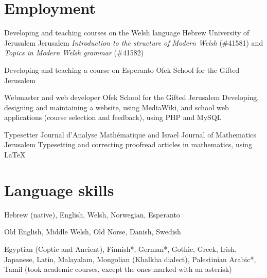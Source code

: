


\section{Employment}

	{Developing and teaching courses on the Welsh language}
	{Hebrew University of Jerusalem}
	{Jerusalem}
	{}
	{\emph{Introduction to the structure of Modern Welsh} (\#41581) and \emph{Topics in Modern Welsh grammar} (\#41582)}

	{Developing and teaching a course on Esperanto}
	{Ofek School for the Gifted}
	{Jerusalem}
	{}
	{}

	{Webmaster and web developer}
	{Ofek School for the Gifted}
	{Jerusalem}
	{}
	{Developing, designing and maintaining a website, using MediaWiki, and school web applications (course selection and feedback), using PHP and MySQL}

	{Typesetter}
	{Journal d’Analyse Mathématique and Israel Journal of Mathematics}
	{Jerusalem}
	{}
	{Typesetting and correcting proofread articles in mathematics, using {\texfont\LaTeX}}



\section{Language skills}

	{Hebrew (native), English, Welsh, Norwegian, Esperanto}


	{Old English, Middle Welsh, Old Norse, Danish, Swedish}

	{%
		Egyptian (Coptic and Ancient),
		Finnish*,
		German*,
		Gothic,
		Greek,
		Irish,
		Japanese,
		Latin,
		Malayalam,
		Mongolian (Khalkha dialect),
		Palestinian Arabic*,
		Tamil
		{\normalfont\small (took academic courses, except the ones marked with an asterisk)}
	}



